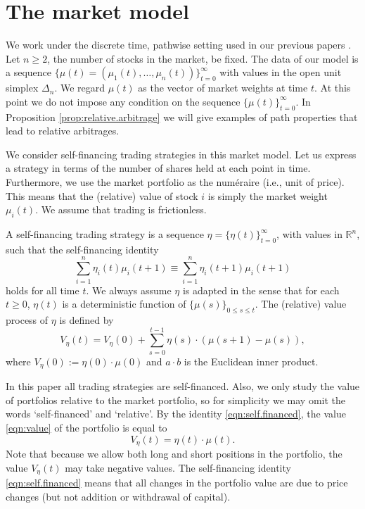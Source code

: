 \documentclass[graybox]{svmult}
\begin{document}
\section{The market model} \label{sec:market.model}
We work under the discrete time, pathwise setting used in our previous papers \cite{PW13, W15, PW15}. Let $n \geq 2$, the number of stocks in the market, be fixed. The data of our model is a sequence $\{\mu(t) = (\mu_1(t), \ldots, \mu_n(t))\}_{t = 0}^{\infty}$ with values in the open unit simplex $\Delta_n$. We regard $\mu(t)$ as the vector of market weights at time $t$. At this point we do not impose any condition on the sequence $\{\mu(t)\}_{t = 0}^{\infty}$. In Proposition \ref{prop:relative.arbitrage} we will give examples of path properties that lead to relative arbitrages. %

We consider self-financing trading strategies in this market model. Let us express a strategy in terms of the number of shares held at each point in time. Furthermore, we use the market portfolio as the num\'{e}raire (i.e., unit of price). This means that the (relative) value of stock $i$ is simply the market weight $\mu_i(t)$. We assume that trading is frictionless.

\begin{definition} \label{def:strategy}
A self-financing trading strategy is a sequence $\eta = \{\eta(t)\}_{t = 0}^{\infty}$, with values in $\mathbb{R}^n$, such that the self-financing identity
\begin{equation} \label{eqn:self.financed}
\sum_{i = 1}^n \eta_i(t) \mu_i(t + 1) \equiv \sum_{i = 1}^n \eta_i(t + 1) \mu_i(t + 1)
\end{equation}
holds for all time $t$. We always assume $\eta$ is adapted in the sense that for each $t \geq 0$, $\eta(t)$ is a deterministic function of $\{\mu(s)\}_{0 \leq s \leq t}$. The (relative) value process of $\eta$ is defined by
\begin{equation} \label{eqn:value}
V_{\eta}(t) = V_{\eta}(0) + \sum_{s = 0}^{t - 1}  \eta(s) \cdot (\mu(s + 1) - \mu(s)),
\end{equation}
where $V_{\eta}(0) := \eta(0) \cdot \mu(0)$ and $a \cdot b$ is the Euclidean inner product.
\end{definition}

In this paper all trading strategies are self-financed. Also, we only study the value of portfolios relative to the market portfolio, so for simplicity we may omit the words `self-financed' and `relative'. By the identity \eqref{eqn:self.financed}, the value \eqref{eqn:value} of the portfolio is equal to
\[
V_{\eta}(t) = \eta(t) \cdot \mu(t).
\]
Note that because we allow both long and short positions in the portfolio, the value $V_{\eta}(t)$ may take negative values. The self-financing identity \eqref{eqn:self.financed} means that all changes in the portfolio value are due to price changes (but not addition or withdrawal of capital).
\end{document}
